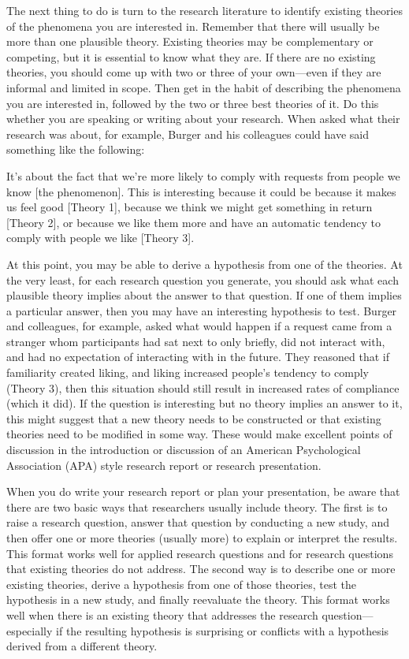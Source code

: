 \documentclass[
]{krantz}
\begin{document}
The next thing to do is turn to the research literature to identify existing theories of the phenomena you are interested in. Remember that there will usually be more than one plausible theory. Existing theories may be complementary or competing, but it is essential to know what they are. If there are no existing theories, you should come up with two or three of your own---even if they are informal and limited in scope. Then get in the habit of describing the phenomena you are interested in, followed by the two or three best theories of it. Do this whether you are speaking or writing about your research. When asked what their research was about, for example, Burger and his colleagues could have said something like the following:

It's about the fact that we're more likely to comply with requests from people we know {[}the phenomenon{]}. This is interesting because it could be because it makes us feel good {[}Theory 1{]}, because we think we might get something in return {[}Theory 2{]}, or because we like them more and have an automatic tendency to comply with people we like {[}Theory 3{]}.

At this point, you may be able to derive a hypothesis from one of the theories. At the very least, for each research question you generate, you should ask what each plausible theory implies about the answer to that question. If one of them implies a particular answer, then you may have an interesting hypothesis to test. Burger and colleagues, for example, asked what would happen if a request came from a stranger whom participants had sat next to only briefly, did not interact with, and had no expectation of interacting with in the future. They reasoned that if familiarity created liking, and liking increased people's tendency to comply (Theory 3), then this situation should still result in increased rates of compliance (which it did). If the question is interesting but no theory implies an answer to it, this might suggest that a new theory needs to be constructed or that existing theories need to be modified in some way. These would make excellent points of discussion in the introduction or discussion of an American Psychological Association (APA) style research report or research presentation.

When you do write your research report or plan your presentation, be aware that there are two basic ways that researchers usually include theory. The first is to raise a research question, answer that question by conducting a new study, and then offer one or more theories (usually more) to explain or interpret the results. This format works well for applied research questions and for research questions that existing theories do not address. The second way is to describe one or more existing theories, derive a hypothesis from one of those theories, test the hypothesis in a new study, and finally reevaluate the theory. This format works well when there is an existing theory that addresses the research question---especially if the resulting hypothesis is surprising or conflicts with a hypothesis derived from a different theory.
\end{document}
